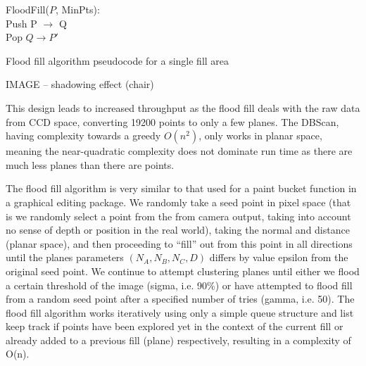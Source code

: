 \documentclass[]{article}
\begin{document}
{\begin{algorithm}[tbp]
	\SetAlgoLined
	\bigskip
	FloodFill($P$, MinPts): \\
	Push P $\rightarrow$ Q \\
	{
	 	Pop $Q \rightarrow P'$ \\
	}
	\bigskip
	\caption{Flood fill algorithm pseudocode for a single fill area}
	\label{alg:Flood fill algorithm pseudocode for a single fill area}
\end{algorithm}

IMAGE – shadowing effect (chair)

This design leads to increased throughput as the flood fill deals with the raw data from CCD space, converting 19200 points to only a few planes.  The DBScan, having complexity towards a greedy $O(n^{2})$, only works in planar space, meaning the near-quadratic complexity does not dominate run time as there are much less planes than there are points. 

The flood fill algorithm is very similar to that used for a paint bucket function in a graphical editing package. We randomly take a seed point in pixel space (that is we randomly select a point from the from camera output, taking into account no sense of depth or position in the real world), taking the normal and distance (planar space), and then proceeding to “fill” out from this point in all directions until the planes parameters $(N_A, N_B, N_C, D)$ differs by value epsilon from the original seed point. We continue to attempt clustering planes until either we flood a certain threshold of the image (sigma, i.e. 90\%) or have attempted to flood fill from a random seed point after a specified number of tries (gamma, i.e. 50). The flood fill algorithm works iteratively using only a simple queue structure and list keep track if points have been explored yet in the context of the current fill or already added to a previous fill (plane) respectively, resulting in a complexity of O(n). 

}
\end{document}
